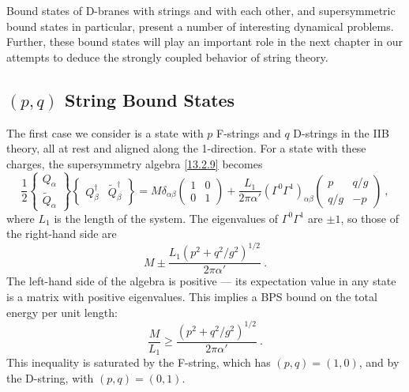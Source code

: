 Bound states of D-branes with strings and with each other, and supersymmetric bound states in particular, present a number of interesting dynamical problems. Further, these bound states will play an important role in the next chapter in our attempts to deduce the strongly coupled behavior of string theory.

\subsection*{$(p,q)$ String Bound States}

The first case we consider is a state with $p$ F-strings and $q$ D-strings in the IIB theory, all at rest and aligned along the 1-direction. For a state with these charges, the supersymmetry algebra \eqref{13.2.9} becomes
\begin{equation}
	\frac{1}{2}\begin{Bmatrix} Q_\alpha \\ \tilde{Q}_\alpha \end{Bmatrix}\begin{Bmatrix} Q_\beta^\dagger & \tilde{Q}_\beta^\dagger \end{Bmatrix} = M\delta_{\alpha\beta}\begin{pmatrix} 1 & 0 \\ 0 & 1 \end{pmatrix} + \frac{L_1}{2\pi\alpha'}(\Gamma^0\Gamma^1)_{\alpha\beta}\begin{pmatrix} p & q/g \\ q/g & -p \end{pmatrix} \:, \label{13.6.1}
\end{equation}
where $L_1$ is the length of the system. The eigenvalues of $\Gamma^0\Gamma^1$ are $\pm 1$, so those of the right-hand side are
\begin{equation}
	M \pm \frac{L_1(p^2 + q^2/g^2)^{1/2}}{2\pi\alpha'} \:. \label{13.6.2}
\end{equation}
The left-hand side of the algebra is positive --- its expectation value in any state is a matrix with positive eigenvalues. This implies a BPS bound on the total energy per unit length:
\begin{equation}
	\frac{M}{L_1} \ge \frac{(p^2 + q^2/g^2)^{1/2}}{2\pi\alpha'} \:. \label{13.6.3}
\end{equation}
This inequality is saturated by the F-string, which has $(p,q) = (1,0)$, and by the D-string, with $(p,q) = (0,1)$.
